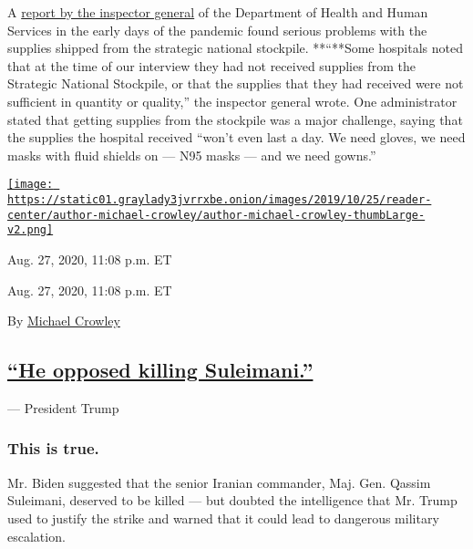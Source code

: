 A
\href{https://slack-redir.net/link?url=https\%3A\%2F\%2Foig.hhs.gov\%2Foei\%2Freports\%2Foei-06-20-00300.pdf}{report
by the inspector general} of the Department of Health and Human Services
in the early days of the pandemic found serious problems with the
supplies shipped from the strategic national stockpile. **``**Some
hospitals noted that at the time of our interview they had not received
supplies from the Strategic National Stockpile, or that the supplies
that they had received were not sufficient in quantity or quality,'' the
inspector general wrote. One administrator stated that getting supplies
from the stockpile was a major challenge, saying that the supplies the
hospital received ``won't even last a day. We need gloves, we need masks
with fluid shields on --- N95 masks --- and we need gowns.''

\href{https://www.nytimes3xbfgragh.onion/by/michael-crowley}{\texttt{[image: https://static01.graylady3jvrrxbe.onion/images/2019/10/25/reader-center/author-michael-crowley/author-michael-crowley-thumbLarge-v2.png]}}

Aug. 27, 2020, 11:08 p.m. ET

Aug. 27, 2020, 11:08 p.m. ET

By \href{https://www.nytimes3xbfgragh.onion/by/michael-crowley}{Michael
Crowley}

\hypertarget{he-opposed-killing-suleimani}{%
\subsection{\texorpdfstring{\protect\hyperlink{he-opposed-killing-suleimani}{``He
opposed killing
Suleimani.''}}{``He opposed killing Suleimani.''}}\label{he-opposed-killing-suleimani}}

--- President Trump

\hypertarget{this-is-true}{%
\subsubsection{\texorpdfstring{\textbf{This is
true.}}{This is true.}}\label{this-is-true}}

Mr. Biden suggested that the senior Iranian commander, Maj. Gen. Qassim
Suleimani, deserved to be killed --- but doubted the intelligence that
Mr. Trump used to justify the strike and warned that it could lead to
dangerous military escalation.

